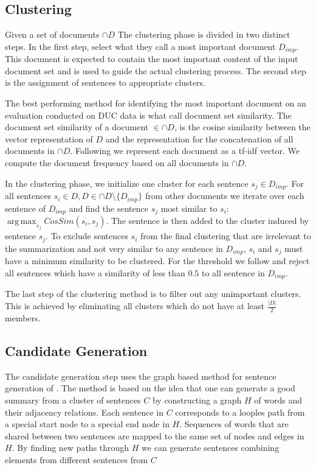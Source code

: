 \documentclass[a4paper,BCOR=10mm]{report}
\DeclareMathOperator*{\argmax}{arg\,max}
\numberwithin{lemma}{chapter}
\numberwithin{definition}{chapter}
\begin{document}
\subsection{Clustering}  \label{sec:baseline-clustering}

Given a set of documents $\cap{D}$ The clustering phase is divided in two distinct steps. In the first step, \citeauthor{banerjee} select what they call a most important document $D_{imp}$. This document is expected to contain the most important content of the input document set and is used to guide the actual clustering process. The second step is the assignment of sentences to appropriate clusters.

The best performing method for identifying the most important document on an evaluation conducted on DUC data is what \citeauthor{banerjee} call document set similarity.
The document set similarity of a document $ \in \cap{D}$, is the cosine similarity between the vector representation of $D$ and the representation for the concatenation of all documents in $\cap{D}$.
Following \citeauthor{banerjee} we represent each document as a tf-idf vector. We compute the document frequency based on all documents in $\cap{D}$.

In the clustering phase, we initialize one cluster for each sentence $s_j \in D_{imp}$. For all sentences $s_i \in D, D \in \cap{D} \setminus \{D_{imp}\}$ from other documents we iterate over each sentence of $D_{imp}$ and find the sentence $s_j$ most similar to $s_i$: $\argmax_{s_j} \mathit{CosSim}(s_i, s_j)$. The sentence is then added to the cluster induced by sentence $s_j$. To exclude sentences $s_i$ from the final clustering that are irrelevant to the summarization and not very similar to any sentence in $D_{imp}$, $s_i$ and $s_j$ must have a minimum similarity to be clustered.
For the threshold we follow \citeauthor{banerjee} and reject all sentences which have a similarity of less than $0.5$ to all sentence in $D_{imp}$.

The last step of the clustering method is to filter out any unimportant clusters. This is achieved by eliminating all clusters which do not have at least $\frac{|D|}{2}$ members.


\subsection{Candidate Generation} \label{sec:baseline-generation}

The candidate generation step uses the graph based method for sentence generation of \citet{filippova}. The method is based on the idea that one can generate a good summary from a cluster of sentences $C$ by constructing a graph $H$ of words and their adjacency relations. Each sentence in $C$ corresponds to a looples path from a special start node to a special end node in $H$. Sequences of words that are shared between two sentences are mapped to the same set of nodes and edges in $H$. By finding new paths through $H$ we can generate sentences combining elements from different sentences from $C$
\end{document}
